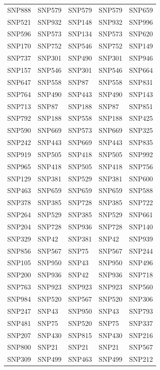 \begin{table}[ht]
\begin{tabular}{lllll}
  SNP888 & SNP579 & SNP579 & SNP579 & SNP659 \\ 
  SNP521 & SNP932 & SNP148 & SNP932 & SNP996 \\ 
  SNP596 & SNP573 & SNP134 & SNP573 & SNP620 \\ 
  SNP170 & SNP752 & SNP546 & SNP752 & SNP149 \\ 
  SNP737 & SNP301 & SNP490 & SNP301 & SNP946 \\ 
  SNP157 & SNP546 & SNP301 & SNP546 & SNP664 \\ 
  SNP647 & SNP558 & SNP87 & SNP558 & SNP831 \\ 
  SNP764 & SNP490 & SNP443 & SNP490 & SNP143 \\ 
  SNP713 & SNP87 & SNP188 & SNP87 & SNP851 \\ 
  SNP792 & SNP188 & SNP558 & SNP188 & SNP425 \\ 
  SNP590 & SNP669 & SNP573 & SNP669 & SNP325 \\ 
  SNP242 & SNP443 & SNP669 & SNP443 & SNP835 \\ 
  SNP919 & SNP505 & SNP418 & SNP505 & SNP992 \\ 
  SNP965 & SNP418 & SNP505 & SNP418 & SNP756 \\ 
  SNP129 & SNP381 & SNP529 & SNP381 & SNP600 \\ 
  SNP463 & SNP659 & SNP659 & SNP659 & SNP588 \\ 
  SNP378 & SNP385 & SNP728 & SNP385 & SNP722 \\ 
  SNP264 & SNP529 & SNP385 & SNP529 & SNP661 \\ 
  SNP204 & SNP728 & SNP936 & SNP728 & SNP140 \\ 
  SNP329 & SNP42 & SNP381 & SNP42 & SNP939 \\ 
  SNP856 & SNP567 & SNP75 & SNP567 & SNP244 \\ 
  SNP105 & SNP950 & SNP43 & SNP950 & SNP496 \\ 
  SNP200 & SNP936 & SNP42 & SNP936 & SNP718 \\ 
  SNP763 & SNP923 & SNP923 & SNP923 & SNP560 \\ 
  SNP984 & SNP520 & SNP567 & SNP520 & SNP306 \\ 
  SNP247 & SNP43 & SNP950 & SNP43 & SNP793 \\ 
  SNP481 & SNP75 & SNP520 & SNP75 & SNP337 \\ 
  SNP207 & SNP430 & SNP815 & SNP430 & SNP216 \\ 
  SNP800 & SNP21 & SNP21 & SNP21 & SNP567 \\ 
  SNP309 & SNP499 & SNP463 & SNP499 & SNP212 \\ 

\end{tabular}
\end{table}

